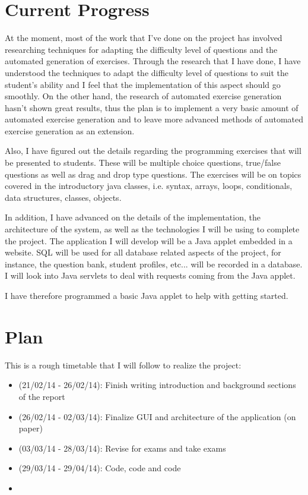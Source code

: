 \documentclass[11pt,a4paper]{report}
\begin{document}
\section{Current Progress}
At the moment, most of the work that I've done on the project has involved researching techniques for adapting the difficulty level of questions and the automated generation of exercises. Through the research that I have done, I have understood the techniques to adapt the difficulty level of questions to suit the student's ability and I feel that the implementation of this aspect should go smoothly. On the other hand, the research of automated exercise generation hasn't shown great results, thus the plan is to implement a very basic amount of automated exercise generation and to leave more advanced methods of automated exercise generation as an extension. \newline

Also, I have figured out the details regarding the programming exercises that will be presented to students. These will be multiple choice questions, true/false questions as well as drag and drop type questions. The exercises will be on topics covered in the introductory java classes, i.e. syntax, arrays, loops, conditionals, data structures, classes, objects.
\newline

In addition, I have advanced on the details of the implementation, the architecture of the system, as well as the technologies I will be using to complete the project. The application I will develop will be a Java applet embedded in a website. SQL will be used for all database related aspects of the project, for instance, the question bank, student profiles, etc... will be recorded in a database. I will look into Java servlets to deal with requests coming from the Java applet. \newline

I have therefore programmed a basic Java applet to help with getting started.

\section{Plan}
This is a rough timetable that I will follow to realize the project:
\begin{itemize}
\item (21/02/14 - 26/02/14): Finish writing introduction and background sections of the report
\item (26/02/14 - 02/03/14): Finalize GUI and architecture of the application (on paper)
\item (03/03/14 - 28/03/14): Revise for exams and take exams
\item (29/03/14 - 29/04/14): Code, code and code
\item 
\end{itemize}
\end{document}
